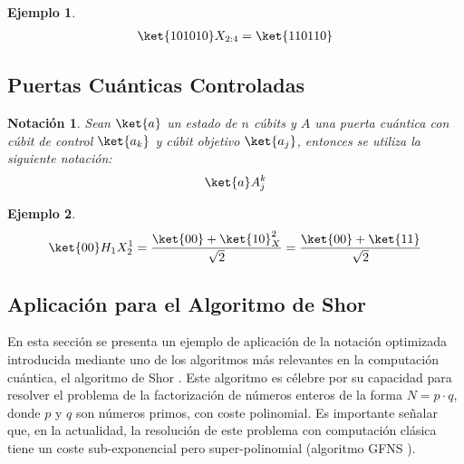 \documentclass[10pt,conference,a4paper]{IEEEtran}
\newtheorem{notacion}{Notación}[subsection]
\newtheorem{ejemplo}{Ejemplo}
\begin{document}
\begin{ejemplo}
    \begin{align*}
        \ket{101010}X_{2:4}=\ket{110110}
    \end{align*}
\end{ejemplo} 
\vspace{0.1cm}
\subsection{Puertas Cuánticas Controladas}

\begin{notacion}
\label{not:controladas}
    Sean $\ket{a}$ un estado de $n$ cúbits y $A$ una puerta cuántica con cúbit de control $\ket{a_k}$ y cúbit objetivo $\ket{a_j}$, entonces se utiliza la siguiente notación:
    \begin{equation}
        \ket{a}A_j^k
    \end{equation}
\end{notacion}
\begin{ejemplo}
\begin{align*}
    \ket{00}H_1X_2^1=\dfrac{\ket{00}+\ket{10}_X^2}{\sqrt{2}}=\dfrac{\ket{00}+\ket{11}}{\sqrt{2}}
\end{align*}
\end{ejemplo}

\subsection{Aplicación para el Algoritmo de Shor}
En esta sección se presenta un ejemplo de aplicación de la notación optimizada introducida mediante uno de los algoritmos más relevantes en la computación cuántica, el algoritmo de Shor \cite{Shor}. Este algoritmo es célebre por su capacidad para resolver el problema de la factorización de números enteros de la forma $N=p\cdot q$, donde $p$ y $q$ son números primos, con coste polinomial. Es importante señalar que, en la actualidad, la resolución de este problema con computación clásica tiene un coste sub-exponencial pero super-polinomial (algoritmo GFNS \cite{GNFS} \cite{GNFS_book}). 
\end{document}
